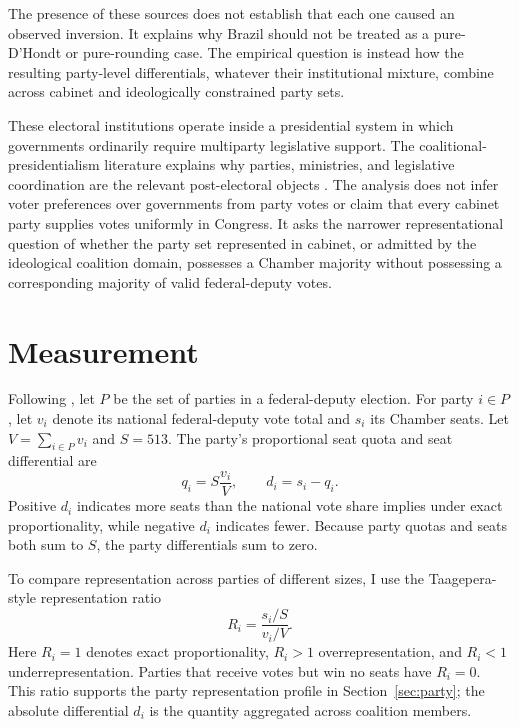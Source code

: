 \documentclass[11pt]{article}
\newcommand{\Parties}{P}
\begin{document}
The presence of these sources does not establish that each one caused an
observed inversion. It explains why Brazil should not be treated as a
pure-D'Hondt or pure-rounding case. The empirical question is instead how
the resulting party-level differentials, whatever their institutional mixture,
combine across cabinet and ideologically constrained party sets.

These electoral institutions operate inside a presidential system in which
governments ordinarily require multiparty legislative support. The
coalitional-presidentialism literature explains why parties, ministries, and
legislative coordination are the relevant post-electoral objects
\parencite{abranches1988presidencialismo,
figueiredo2000presidential,pereira2004cost}. The analysis does not infer
voter preferences over governments from party votes or claim that every
cabinet party supplies votes uniformly in Congress. It asks the narrower
representational question of whether the party set represented in cabinet,
or admitted by the ideological coalition domain, possesses a Chamber
majority without possessing a corresponding majority of valid
federal-deputy votes.

\section{Measurement}
\label{sec:mea}

Following \textcite{miller14_elect_inver_under_propor_repres}, let
\(\Parties\) be the set of parties in a federal-deputy election. For party
\(i\in\Parties\), let \(v_i\) denote its national federal-deputy vote total and
\(s_i\) its Chamber seats. Let \(V=\sum_{i\in\Parties}v_i\) and \(S=513\).
The party's proportional seat quota and seat differential are
\[
q_i=S\frac{v_i}{V},
\qquad
d_i=s_i-q_i.
\]
Positive \(d_i\) indicates more seats than the national vote share implies
under exact proportionality, while negative \(d_i\) indicates fewer. Because
party quotas and seats both sum to \(S\), the party differentials sum to zero.

To compare representation across parties of different sizes, I use the
Taagepera-style representation ratio
\parencite{taagepera1980proportionality}
\[
R_i=\frac{s_i/S}{v_i/V}.
\]
Here \(R_i=1\) denotes exact proportionality, \(R_i>1\) overrepresentation,
and \(R_i<1\) underrepresentation. Parties that receive votes but win no seats
have \(R_i=0\). This ratio supports the party representation profile in
Section~\ref{sec:party}; the absolute differential \(d_i\) is the quantity
aggregated across coalition members.
\end{document}
